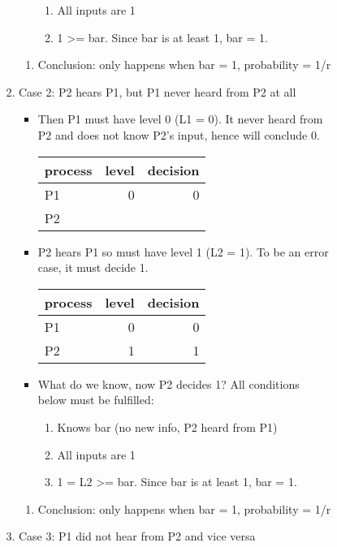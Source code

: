 \documentclass[11pt]{article}
\begin{document}
\begin{enumerate}
\begin{enumerate}
\begin{enumerate}
\begin{enumerate}
\begin{enumerate}
\begin{itemize}
\begin{enumerate}
\item All inputs are 1
\item 1 >= bar. Since bar is at least 1, bar = 1.
\end{enumerate}
\end{itemize}
\begin{enumerate}
\item Conclusion: only happens when bar = 1, probability = 1/r
\label{sec:org8a7c0eb}
\end{enumerate}
\item Case 2: P2 hears P1, but P1 never heard from P2 at all
\label{sec:org5d33b00}
\begin{itemize}
\item Then P1 must have level 0 (L1 = 0). It never heard from P2 and does not know
P2's input, hence will conclude 0.
\begin{center}
\begin{tabular}{lrr}
process & level & decision\\
\hline
P1 & 0 & 0\\
P2 &  & \\
\end{tabular}
\end{center}
\item P2 hears P1 so must have level 1 (L2 = 1). To be an error case, it must
decide 1.
\begin{center}
\begin{tabular}{lrr}
process & level & decision\\
\hline
P1 & 0 & 0\\
P2 & 1 & 1\\
\end{tabular}
\end{center}
\item What do we know, now P2 decides 1? All conditions below must be fulfilled:
\begin{enumerate}
\item Knows bar (no new info, P2 heard from P1)
\item All inputs are 1
\item 1 = L2 >= bar. Since bar is at least 1, bar = 1.
\end{enumerate}
\end{itemize}
\begin{enumerate}
\item Conclusion: only happens when bar = 1, probability = 1/r
\label{sec:orgb2fbe45}
\end{enumerate}
\item Case 3: P1 did not hear from P2 and vice versa

\end{enumerate}
\end{enumerate}
\end{enumerate}
\end{enumerate}
\end{enumerate}
\end{document}
